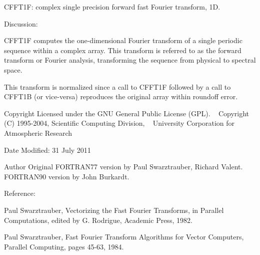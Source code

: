 C\+F\+F\+T1F\+: complex single precision forward fast Fourier transform, 1D. 

\begin{DoxyVerb}  Discussion:

    CFFT1F computes the one-dimensional Fourier transform of a single 
    periodic sequence within a complex array.  This transform is referred 
    to as the forward transform or Fourier analysis, transforming the 
    sequence from physical to spectral space.

    This transform is normalized since a call to CFFT1F followed
    by a call to CFFT1B (or vice-versa) reproduces the original
    array within roundoff error.\end{DoxyVerb}
 \begin{DoxyCopyright}{Copyright}
Licensed under the G\+NU General Public License (G\+PL). ~\newline
 Copyright (C) 1995-\/2004, Scientific Computing Division, ~\newline
 University Corporation for Atmospheric Research 
\end{DoxyCopyright}
\begin{DoxyDate}{Date}
Modified\+: 31 July 2011 
\end{DoxyDate}
\begin{DoxyAuthor}{Author}
Original F\+O\+R\+T\+R\+A\+N77 version by Paul Swarztrauber, Richard Valent. ~\newline
 F\+O\+R\+T\+R\+A\+N90 version by John Burkardt.
\end{DoxyAuthor}
\begin{DoxyVerb}  Reference:

    Paul Swarztrauber,
    Vectorizing the Fast Fourier Transforms,
    in Parallel Computations,
    edited by G. Rodrigue,
    Academic Press, 1982.

    Paul Swarztrauber,
    Fast Fourier Transform Algorithms for Vector Computers,
    Parallel Computing, pages 45-63, 1984.\end{DoxyVerb}
 

